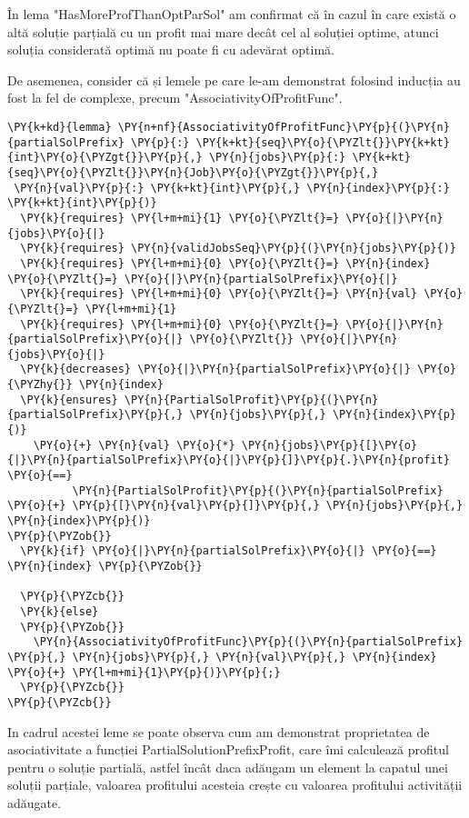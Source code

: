 În lema "HasMoreProfThanOptParSol" am confirmat că în cazul în care există o altă soluție parțială cu un profit mai mare decât cel al soluției optime, atunci soluția considerată optimă nu poate fi cu adevărat optimă.

De asemenea, consider că și lemele pe care le-am demonstrat folosind inducția au fost la fel de complexe, precum "AssociativityOfProfitFunc".

\begin{Verbatim}[commandchars=\\\{\},fontsize=\small]
\PY{k+kd}{lemma} \PY{n+nf}{AssociativityOfProfitFunc}\PY{p}{(}\PY{n}{partialSolPrefix} \PY{p}{:} \PY{k+kt}{seq}\PY{o}{\PYZlt{}}\PY{k+kt}{int}\PY{o}{\PYZgt{}}\PY{p}{,} \PY{n}{jobs}\PY{p}{:} \PY{k+kt}{seq}\PY{o}{\PYZlt{}}\PY{n}{Job}\PY{o}{\PYZgt{}}\PY{p}{,}
 \PY{n}{val}\PY{p}{:} \PY{k+kt}{int}\PY{p}{,} \PY{n}{index}\PY{p}{:} \PY{k+kt}{int}\PY{p}{)}
  \PY{k}{requires} \PY{l+m+mi}{1} \PY{o}{\PYZlt{}=} \PY{o}{|}\PY{n}{jobs}\PY{o}{|}
  \PY{k}{requires} \PY{n}{validJobsSeq}\PY{p}{(}\PY{n}{jobs}\PY{p}{)}
  \PY{k}{requires} \PY{l+m+mi}{0} \PY{o}{\PYZlt{}=} \PY{n}{index} \PY{o}{\PYZlt{}=} \PY{o}{|}\PY{n}{partialSolPrefix}\PY{o}{|}
  \PY{k}{requires} \PY{l+m+mi}{0} \PY{o}{\PYZlt{}=} \PY{n}{val} \PY{o}{\PYZlt{}=} \PY{l+m+mi}{1}
  \PY{k}{requires} \PY{l+m+mi}{0} \PY{o}{\PYZlt{}=} \PY{o}{|}\PY{n}{partialSolPrefix}\PY{o}{|} \PY{o}{\PYZlt{}} \PY{o}{|}\PY{n}{jobs}\PY{o}{|} 
  \PY{k}{decreases} \PY{o}{|}\PY{n}{partialSolPrefix}\PY{o}{|} \PY{o}{\PYZhy{}} \PY{n}{index}
  \PY{k}{ensures} \PY{n}{PartialSolProfit}\PY{p}{(}\PY{n}{partialSolPrefix}\PY{p}{,} \PY{n}{jobs}\PY{p}{,} \PY{n}{index}\PY{p}{)} 
    \PY{o}{+} \PY{n}{val} \PY{o}{*} \PY{n}{jobs}\PY{p}{[}\PY{o}{|}\PY{n}{partialSolPrefix}\PY{o}{|}\PY{p}{]}\PY{p}{.}\PY{n}{profit} \PY{o}{==}
          \PY{n}{PartialSolProfit}\PY{p}{(}\PY{n}{partialSolPrefix} \PY{o}{+} \PY{p}{[}\PY{n}{val}\PY{p}{]}\PY{p}{,} \PY{n}{jobs}\PY{p}{,} \PY{n}{index}\PY{p}{)}
\PY{p}{\PYZob{}}
  \PY{k}{if} \PY{o}{|}\PY{n}{partialSolPrefix}\PY{o}{|} \PY{o}{==} \PY{n}{index} \PY{p}{\PYZob{}}

  \PY{p}{\PYZcb{}}
  \PY{k}{else}
  \PY{p}{\PYZob{}}
    \PY{n}{AssociativityOfProfitFunc}\PY{p}{(}\PY{n}{partialSolPrefix} \PY{p}{,} \PY{n}{jobs}\PY{p}{,} \PY{n}{val}\PY{p}{,} \PY{n}{index} \PY{o}{+} \PY{l+m+mi}{1}\PY{p}{)}\PY{p}{;}
  \PY{p}{\PYZcb{}}
\PY{p}{\PYZcb{}}
\end{Verbatim}

In cadrul acestei leme se poate observa cum am demonstrat proprietatea de asociativitate a funcției  PartialSolutionPrefixProfit, care îmi calculează profitul pentru o soluție partială, astfel încât daca adăugam un element la capatul unei soluții parțiale, valoarea profitului acesteia crește cu valoarea profitului activității adăugate. 

